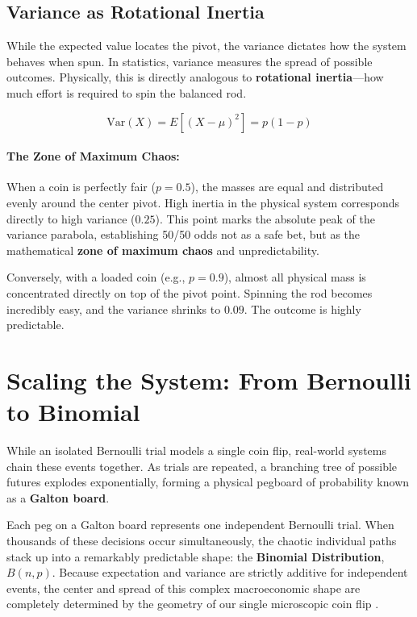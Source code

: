 \documentclass[12pt]{article}
\newcommand{\purplehighlight}[1]{\textcolor{purplehl}{\textbf{#1}}}
\begin{document}
\subsection{Variance as Rotational Inertia}
While the expected value locates the pivot, the variance dictates how the system behaves when spun. In statistics, variance measures the spread of possible outcomes. Physically, this is directly analogous to \purplehighlight{rotational inertia}---how much effort is required to spin the balanced rod.

\begin{goldformula}
\begin{equation}
\text{Var}(X) = E[(X - \mu)^2] = p(1 - p)
\end{equation}
\end{goldformula}

\paragraph{\purplehighlight{The Zone of Maximum Chaos:}}
When a coin is perfectly fair ($p = 0.5$), the masses are equal and distributed evenly around the center pivot. High inertia in the physical system corresponds directly to high variance ($0.25$). This point marks the absolute peak of the variance parabola, establishing 50/50 odds not as a safe bet, but as the mathematical \purplehighlight{zone of maximum chaos} and unpredictability.

Conversely, with a loaded coin (e.g., $p = 0.9$), almost all physical mass is concentrated directly on top of the pivot point. Spinning the rod becomes incredibly easy, and the variance shrinks to $0.09$. The outcome is highly predictable.

\section{Scaling the System: From Bernoulli to Binomial}
While an isolated Bernoulli trial models a single coin flip, real-world systems chain these events together. As trials are repeated, a branching tree of possible futures explodes exponentially, forming a physical pegboard of probability known as a \purplehighlight{Galton board}.

Each peg on a Galton board represents one independent Bernoulli trial. When thousands of these decisions occur simultaneously, the chaotic individual paths stack up into a remarkably predictable shape: the \purplehighlight{Binomial Distribution}, $B(n, p)$. Because expectation and variance are strictly additive for independent events, the center and spread of this complex macroeconomic shape are completely determined by the geometry of our single microscopic coin flip \cite{feller1968}.
\end{document}
